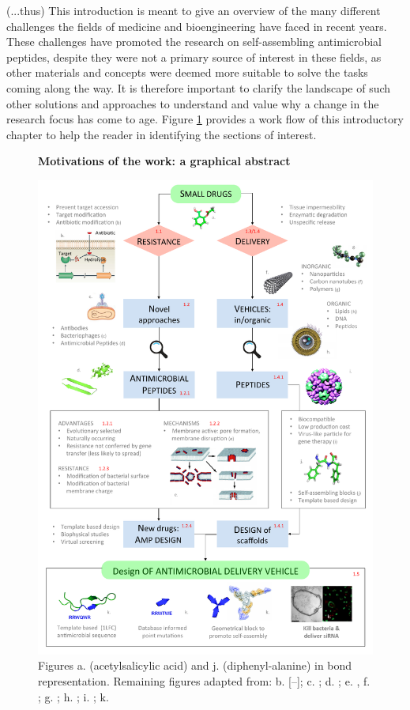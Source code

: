 \vspace{1cm}
(...thus) This introduction is meant to give an overview of the many different challenges the fields of medicine and bioengineering have faced in recent years. These challenges have promoted the research on self-assembling antimicrobial peptides, despite they were not a primary source of interest in these fields, as other materials and concepts were deemed more suitable to solve the tasks coming along the way. It is therefore important to clarify the landscape of such other solutions and approaches to understand and value why a change in the research focus has come to age. Figure \ref{fig:intro} provides a work flow of this introductory chapter to help the reader in identifying the sections of interest.

\begin{figure}
\begin{center}
\Large{\textbf{Motivations of the work: a graphical abstract}}\par\bigskip
\includegraphics[width = \textwidth]{pics/scheme_intro}
\caption[Graphical abstract of introduction]{Figures a. (acetylsalicylic acid) and j. (diphenyl-alanine) in bond representation. Remaining figures adapted from: b. [--]; c. \cite{poly}; d. \cite{lipo}; e. \cite{Schoonen2014}, f. \cite{Blair2014}; g. \cite{phage}; h. \cite{Torres2019}; i. \cite{Nguyen2011}; k. \cite{Castelletto2016}} \label{fig:intro}
\end{center}
\end{figure}

